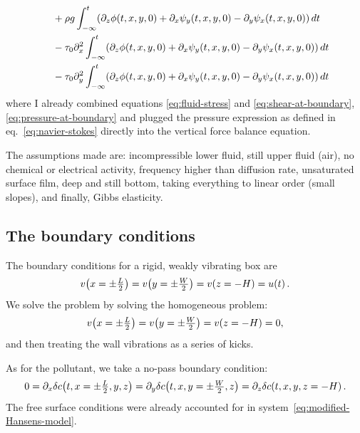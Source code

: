 \documentclass[reqno]{amsart}
\numberwithin{equation}{section}
\numberwithin{figure}{section}
\begin{document}
\begin{align}
  &\phantom{=}\,\,+\sDensity g\int_{-\infty}^{t}\!\left(\partial_{z}\vPotential\!\left(t,x,y,0\right)+\partial_{x}\vStream_{y}\!\left(t,x,y,0\right)-\partial_{y}\vStream_{x}\!\left(t,x,y,0\right)\right)dt \nonumber \\
  &\phantom{=}\,\,-\sTension_{0}\partial_{x}^{2}\int_{-\infty}^{t}\!\left(\partial_{z}\vPotential\!\left(t,x,y,0\right)+\partial_{x}\vStream_{y}\!\left(t,x,y,0\right)-\partial_{y}\vStream_{x}\!\left(t,x,y,0\right)\right)dt \nonumber \\
  &\phantom{=}\,\,-\sTension_{0}\partial_{y}^{2}\int_{-\infty}^{t}\!\left(\partial_{z}\vPotential\!\left(t,x,y,0\right)+\partial_{x}\vStream_{y}\!\left(t,x,y,0\right)-\partial_{y}\vStream_{x}\!\left(t,x,y,0\right)\right)dt \nonumber
\end{align}
where I already combined equations \eqref{eq:fluid-stress} and \eqref{eq:shear-at-boundary}, \eqref{eq:pressure-at-boundary} and plugged the pressure expression as defined in eq.~\eqref{eq:navier-stokes} directly into the vertical force balance equation.

The assumptions made are: incompressible lower fluid, still upper fluid (air), no chemical or electrical activity, frequency higher than diffusion rate, unsaturated surface film, deep and still bottom, taking everything to linear order (small slopes), and finally, Gibbs elasticity.

\subsection{The boundary conditions}

The boundary conditions for a rigid, weakly vibrating box are
\begin{equation*}
v\!\left(x=\pm\tfrac{L}{2}\right)=v\!\left(y=\pm\tfrac{W}{2}\right)=v\!\left(z=-H\right)=u\!\left(t\right).
\end{equation*}
We solve the problem by solving the homogeneous problem:
\begin{equation*}
v\!\left(x=\pm\tfrac{L}{2}\right)=v\!\left(y=\pm\tfrac{W}{2}\right)=v\!\left(z=-H\right)=0,
\end{equation*}
and then treating the wall vibrations as a series of kicks.

As for the pollutant, we take a no-pass boundary condition:
\begin{equation*}
0 = \partial_{x}\delta c\!\left(t,x=\pm\tfrac{L}{2},y,z\right)
  = \partial_{y}\delta c\!\left(t,x,y=\pm\tfrac{W}{2},z\right)
  = \partial_{z}\delta c\!\left(t,x,y,z=-H\right).
\end{equation*}
The free surface conditions were already accounted for in system~\eqref{eq:modified-Hansens-model}.
\end{document}
